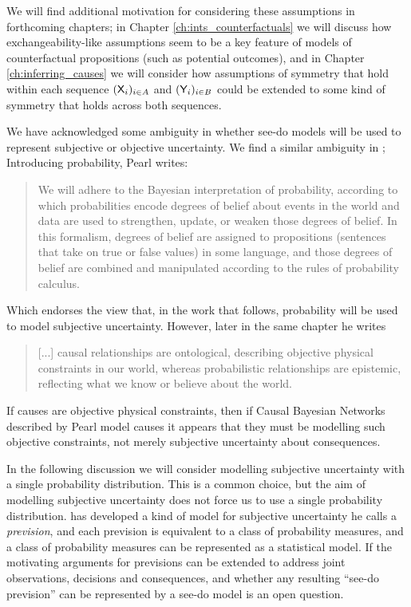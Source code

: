 We will find additional motivation for considering these assumptions in forthcoming chapters; in Chapter \ref{ch:ints_counterfactuals} we will discuss how exchangeability-like assumptions seem to be a key feature of models of counterfactual propositions (such as potential outcomes), and in Chapter \ref{ch:inferring_causes} we will consider how assumptions of symmetry that hold within each sequence $(\mathsf{X}_i)_{i\in A}$ and $(\mathsf{Y}_i)_{i\in B}$ could be extended to some kind of symmetry that holds across both sequences.

We have acknowledged some ambiguity in whether see-do models will be used to represent subjective or objective uncertainty. We find a similar ambiguity in \citet[Chapter 1]{pearl_causality:_2009}; Introducing probability, Pearl writes:

\begin{quote}
We will adhere to the Bayesian interpretation of probability, according to which probabilities encode degrees of belief about events in the world and data are used to strengthen, update, or weaken those degrees of belief. In this formalism, degrees of belief are assigned to propositions (sentences that take on true or false values) in some language, and those degrees of belief are combined and manipulated according to the rules of probability calculus.
\end{quote}

Which endorses the view that, in the work that follows, probability will be used to model subjective uncertainty. However, later in the same chapter he writes

\begin{quote}
[...] causal relationships are ontological, describing objective physical constraints in our world, whereas probabilistic relationships are epistemic, reflecting what we know or believe about the world.
\end{quote}

If causes are objective physical constraints, then if Causal Bayesian Networks described by Pearl model causes it appears that they must be modelling such objective constraints, not merely subjective uncertainty about consequences.

In the following discussion we will consider modelling subjective uncertainty with a single probability distribution. This is a common choice, but the aim of modelling subjective uncertainty does not force us to use a single probability distribution. \citet{walley_statistical_1991} has developed a kind of model for subjective uncertainty he calls a \emph{prevision}, and each prevision is equivalent to a class of probability measures, and a class of probability measures can be represented as a statistical model. If the motivating arguments for previsions can be extended to address joint observations, decisions and consequences, and whether any resulting ``see-do prevision'' can be represented by a see-do model is an open question.

